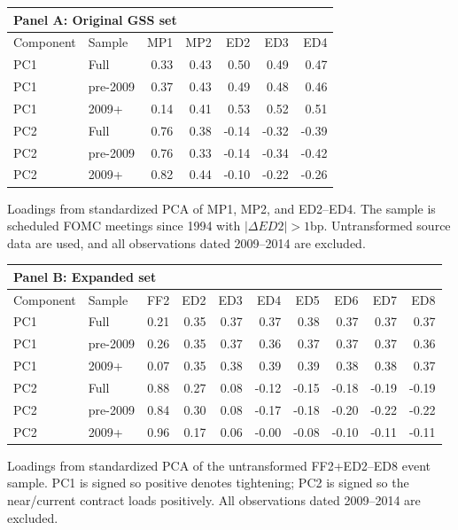 \begin{tabular}{@{}llrrrrr@{}}
\toprule
\multicolumn{7}{l}{Panel A: Original GSS set} \\
\midrule
Component & Sample & MP1 & MP2 & ED2 & ED3 & ED4 \\
\midrule
PC1 & Full & 0.33 & 0.43 & 0.50 & 0.49 & 0.47 \\
PC1 & pre-2009 & 0.37 & 0.43 & 0.49 & 0.48 & 0.46 \\
PC1 & 2009+ & 0.14 & 0.41 & 0.53 & 0.52 & 0.51 \\
\addlinespace
PC2 & Full & 0.76 & 0.38 & -0.14 & -0.32 & -0.39 \\
PC2 & pre-2009 & 0.76 & 0.33 & -0.14 & -0.34 & -0.42 \\
PC2 & 2009+ & 0.82 & 0.44 & -0.10 & -0.22 & -0.26 \\
\bottomrule
\end{tabular}

\smallskip
\begin{minipage}{0.82\linewidth}\footnotesize Loadings from standardized PCA of MP1, MP2, and ED2--ED4. The sample is scheduled FOMC meetings since 1994 with $|\Delta ED2|>1$bp. Untransformed source data are used, and all observations dated 2009--2014 are excluded.\end{minipage}

\medskip

\begin{tabular}{@{}llrrrrrrrr@{}}
\toprule
\multicolumn{10}{l}{Panel B: Expanded set} \\
\midrule
Component & Sample & FF2 & ED2 & ED3 & ED4 & ED5 & ED6 & ED7 & ED8 \\
\midrule
PC1 & Full & 0.21 & 0.35 & 0.37 & 0.37 & 0.38 & 0.37 & 0.37 & 0.37 \\
PC1 & pre-2009 & 0.26 & 0.35 & 0.37 & 0.36 & 0.37 & 0.37 & 0.37 & 0.36 \\
PC1 & 2009+ & 0.07 & 0.35 & 0.38 & 0.39 & 0.39 & 0.38 & 0.38 & 0.37 \\
\addlinespace
PC2 & Full & 0.88 & 0.27 & 0.08 & -0.12 & -0.15 & -0.18 & -0.19 & -0.19 \\
PC2 & pre-2009 & 0.84 & 0.30 & 0.08 & -0.17 & -0.18 & -0.20 & -0.22 & -0.22 \\
PC2 & 2009+ & 0.96 & 0.17 & 0.06 & -0.00 & -0.08 & -0.10 & -0.11 & -0.11 \\
\bottomrule
\end{tabular}

\smallskip
\begin{minipage}{0.82\linewidth}\footnotesize Loadings from standardized PCA of the untransformed FF2+ED2--ED8 event sample. PC1 is signed so positive denotes tightening; PC2 is signed so the near/current contract loads positively. All observations dated 2009--2014 are excluded.\end{minipage}
